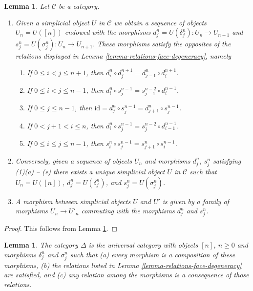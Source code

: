 \documentclass{stacks-project}
\theoremstyle{plain}
\newtheorem{lemma}[subsection]{Lemma}
\theoremstyle{definition}
\theoremstyle{remark}
\numberwithin{equation}{subsection}
\begin{document}
\begin{lemma}
\label{lemma-characterize-simplicial-object}
Let $\mathcal{C}$ be a category.
\begin{enumerate}
\item Given a simplicial object $U$ in $\mathcal{C}$
we obtain a sequence of objects $U_n = U([n])$ endowed
with the morphisms $d^n_j = U(\delta^n_j) : U_n \to U_{n-1}$ and
$s^n_j = U(\sigma^n_j) : U_n \to U_{n + 1}$. These morphisms
satisfy the opposites of the relations displayed in
Lemma \ref{lemma-relations-face-degeneracy}, namely
\begin{enumerate}
\item If $0 \leq i < j \leq n + 1$, then
$d^n_i \circ d^{n + 1}_j = d^n_{j - 1} \circ d^{n + 1}_i$.
\item If $0 \leq i < j \leq n - 1$, then
$d^n_i \circ s^{n - 1}_j = s^{n - 2}_{j - 1} \circ d^{n - 1}_i$.
\item If $0 \leq j \leq n - 1$, then
$\text{id} = d^n_j \circ s^{n - 1}_j = d^n_{j + 1} \circ s^{n - 1}_j$.
\item If $0 < j + 1 < i \leq n$, then
$d^n_i \circ s^{n - 1}_j = s^{n - 2}_j \circ d^{n - 1}_{i - 1}$.
\item If $0 \leq i \leq j \leq n - 1$, then
$s^n_i \circ s^{n - 1}_j = s^n_{j + 1} \circ s^{n - 1}_i$.
\end{enumerate}
\item Conversely, given a sequence of objects $U_n$ and morphisms
$d^n_j$, $s^n_j$ satisfying (1)(a) -- (e) there exists a unique
simplicial object $U$ in $\mathcal{C}$ such that $U_n = U([n])$,
$d^n_j = U(\delta^n_j)$, and $s^n_j = U(\sigma^n_j)$.
\item A morphism between simplicial objects $U$ and $U'$
is given by a family of morphisms $U_n \to U'_n$ commuting
with the morphisms $d^n_j$ and $s^n_j$.
\end{enumerate}
\end{lemma}

\begin{proof}
This follows from Lemma \ref{lemma-face-degeneracy-category}.
\end{proof}

\begin{lemma}
\label{lemma-face-degeneracy-category}
The category $\Delta$ is the universal category
with objects $[n]$, $n \geq 0$ and morphisms
$\delta^n_j$ and $\sigma^n_j$ such that (a) every morphism is
a composition of these morphisms, (b) the relations
listed in Lemma \ref{lemma-relations-face-degeneracy} are satisfied,
and (c) any relation among the morphisms is a consequence of
those relations.
\end{lemma}
\end{document}
